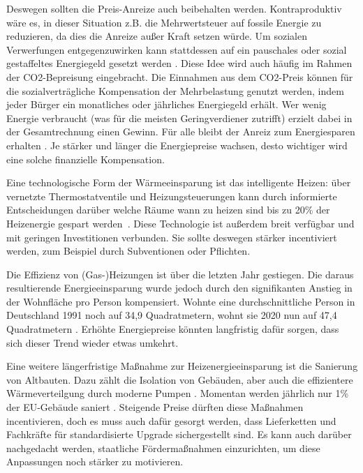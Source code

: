 Deswegen sollten die Preis-Anreize auch beibehalten werden. Kontraproduktiv wäre es, in dieser Situation z.B. die Mehrwertsteuer auf fossile Energie zu reduzieren, da dies die Anreize außer Kraft setzen würde. Um sozialen Verwerfungen entgegenzuwirken kann stattdessen auf ein pauschales oder sozial gestaffeltes Energiegeld gesetzt werden \cite{clausen2022}. Diese Idee wird auch häufig im Rahmen der CO2-Bepreisung eingebracht. Die Einnahmen aus dem CO2-Preis können für die sozialverträgliche Kompensation der Mehrbelastung genutzt werden, indem jeder Bürger ein monatliches oder jährliches Energiegeld erhält. Wer wenig Energie verbraucht (was für die meisten Geringverdiener zutrifft) erzielt dabei in der Gesamtrechnung einen Gewinn. Für alle bleibt der Anreiz zum Energiesparen erhalten \cite{leo}. Je stärker und länger die Energiepreise wachsen, desto wichtiger wird eine solche finanzielle Kompensation.

Eine technologische Form der Wärmeeinsparung ist das intelligente Heizen: über vernetzte Thermostatventile und Heizungsteuerungen kann durch informierte Entscheidungen darüber welche Räume wann zu heizen sind bis zu 20\% der Heizenergie gespart werden~\cite{clausen2022}. Diese Technologie ist außerdem breit verfügbar und mit geringen Investitionen verbunden. Sie sollte deswegen stärker incentiviert werden, zum Beispiel durch Subventionen oder Pflichten.

Die Effizienz von (Gas-)Heizungen ist über die letzten Jahr gestiegen. Die daraus resultierende Energieeinsparung wurde jedoch durch den signifikanten Anstieg in der Wohnfläche pro Person kompensiert. Wohnte eine durchschnittliche Person in Deutschland 1991 noch auf 34,9 Quadratmetern, wohnt sie 2020 nun auf 47,4 Quadratmetern \cite{clausen2022}. Erhöhte Energiepreise könnten langfristig dafür sorgen, dass sich dieser Trend wieder etwas umkehrt.

Eine weitere längerfristige Maßnahme zur Heizenergieeinsparung ist die Sanierung von Altbauten. 
Dazu zählt die Isolation von Gebäuden, aber auch die effizientere Wärmeverteilgung durch moderne Pumpen \cite{ei1}.
Momentan werden jährlich nur 1\% der EU-Gebäude saniert \cite{iea2022}. Steigende Preise dürften diese Maßnahmen incentivieren, doch es muss auch dafür gesorgt werden, dass Lieferketten und Fachkräfte für standardisierte Upgrade sichergestellt sind. Es kann auch darüber nachgedacht werden, staatliche Fördermaßnahmen einzurichten, um diese Anpassungen noch stärker zu motivieren.

